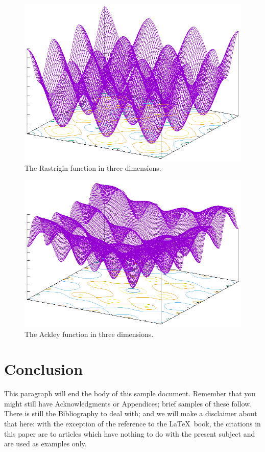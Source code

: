 \begin{figure}
  \includegraphics[width=\columnwidth]{../img/output/rastrigin}
  \caption{The Rastrigin function in three dimensions.}\label{fig:rastrigin}
\end{figure}

\begin{figure}
  \includegraphics[width=\columnwidth]{../img/output/ackley}
  \caption{The Ackley function in three dimensions.}\label{fig:ackley}
\end{figure}


\section{Conclusion}
This paragraph will end the body of this sample document.
Remember that you might still have Acknowledgments or
Appendices; brief samples of these
follow.  There is still the Bibliography to deal with; and
we will make a disclaimer about that here: with the exception
of the reference to the \LaTeX\ book, the citations in
this paper are to articles which have nothing to
do with the present subject and are used as
examples only.


